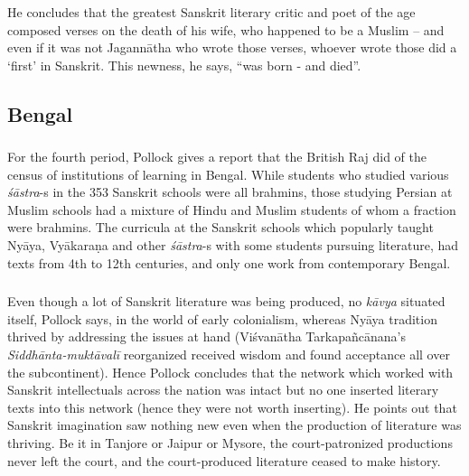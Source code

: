 He concludes that the greatest Sanskrit literary critic and poet of the age composed verses on the death of his wife, who happened to be a Muslim – and even if it was not Jagannātha who wrote those verses, whoever wrote those did a ‘first’ in Sanskrit. This newness, he says, “was born - and died”.

\subsection{Bengal}
\vskip -5pt

\subsubsection{} For the fourth period, Pollock gives a report that the British Raj did of the census of institutions of learning in Bengal. While students who studied various {\sl śāstra}-s in the 353 Sanskrit schools were all brahmins, those studying Persian at Muslim schools had a mixture of Hindu and Muslim students of whom a fraction were brahmins. The curricula at the Sanskrit schools which popularly taught Nyāya, Vyākaraṇa and other {\sl śāstra}-s with some students pursuing literature, had texts from 4th to 12th centuries, and only one work from contemporary Bengal.

\subsubsection{} Even though a lot of Sanskrit literature was being produced, no {\sl kāvya} situated itself, Pollock says,  in the world of early colonialism, whereas Nyāya tradition thrived by addressing the issues at hand (Viśvanātha Tarkapañcānana’s {\sl Siddhānta-muktāvalī} reorganized received wisdom and found acceptance all over the subcontinent). Hence Pollock concludes that the network which worked with Sanskrit intellectuals across the nation was intact but no one inserted literary texts into this network (hence they were not worth inserting). He points out that Sanskrit imagination saw nothing new even when the production of literature was thriving. Be it in Tanjore or Jaipur or Mysore, the court-patronized productions never left the court, and the court-produced literature ceased to make history.

